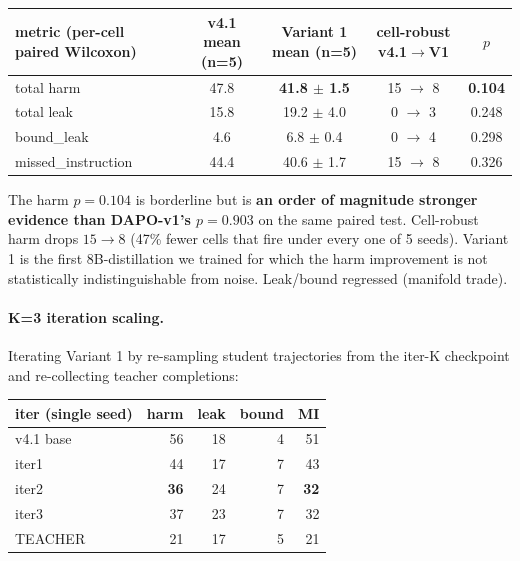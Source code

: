 \documentclass[11pt]{article}
\begin{document}
\begin{center}\small
\begin{tabular}{l c c c c}
\toprule
metric (per-cell paired Wilcoxon) & v4.1 mean (n=5)  & Variant 1 mean (n=5) & cell-robust v4.1$\rightarrow$V1 & $p$ \\
\midrule
total harm              & 47.8             & \textbf{41.8 $\pm$ 1.5}    & 15 $\rightarrow$ 8           & \textbf{0.104} \\
total leak              & 15.8             & 19.2 $\pm$ 4.0             & 0  $\rightarrow$ 3           & 0.248 \\
bound\_leak             & 4.6              & 6.8 $\pm$ 0.4              & 0  $\rightarrow$ 4           & 0.298 \\
missed\_instruction     & 44.4             & 40.6 $\pm$ 1.7             & 15 $\rightarrow$ 8           & 0.326 \\
\bottomrule
\end{tabular}
\end{center}

The harm $p = 0.104$ is borderline but is \textbf{an order of magnitude stronger evidence than DAPO-v1's $p = 0.903$} on the same paired test. Cell-robust harm drops $15 \rightarrow 8$ (47\% fewer cells that fire under every one of 5 seeds). Variant 1 is the first 8B-distillation we trained for which the harm improvement is not statistically indistinguishable from noise. Leak/bound regressed (manifold trade).

\paragraph{K=3 iteration scaling.} Iterating Variant 1 by re-sampling student trajectories from the iter-K checkpoint and re-collecting teacher completions:

\begin{center}\small
\begin{tabular}{l r r r r}
\toprule
iter (single seed)       & harm    & leak  & bound & MI    \\
\midrule
v4.1 base                & 56      & 18    & 4     & 51    \\
iter1                    & 44      & 17    & 7     & 43    \\
iter2                    & \textbf{36} & 24    & 7     & \textbf{32}    \\
iter3                    & 37      & 23    & 7     & 32    \\
TEACHER                  & 21      & 17    & 5     & 21    \\
\bottomrule
\end{tabular}
\end{center}
\end{document}
